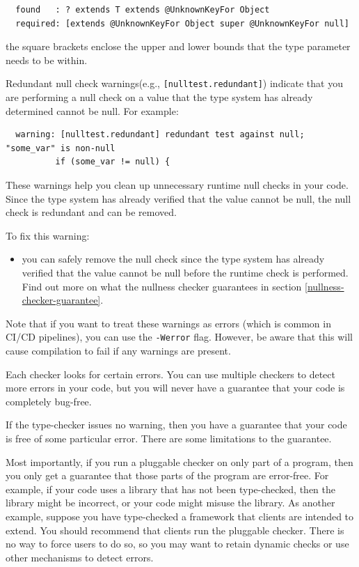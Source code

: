 \begin{Verbatim}
  found   : ? extends T extends @UnknownKeyFor Object
  required: [extends @UnknownKeyFor Object super @UnknownKeyFor null]
\end{Verbatim}

\noindent
the square brackets enclose the upper and lower bounds that the type parameter needs to be within.


Redundant null check warnings(e.g., \texttt{[nulltest.redundant]}) indicate that you are performing a null check on a value that the type system has already determined cannot be null. For example:
\begin{Verbatim}
  warning: [nulltest.redundant] redundant test against null; "some_var" is non-null
          if (some_var != null) {
\end{Verbatim}
These warnings help you clean up unnecessary runtime null checks in your code. Since the type system has already verified that the value cannot be null, the null check is redundant and can be removed.

To fix this warning:
\begin{itemize}
\item
  you can safely remove the null check since the type system has already verified that the value cannot be null before the runtime check is performed. Find out more on what the nullness checker guarantees in section \ref{nullness-checker-guarantee}.
\end{itemize}

Note that if you want to treat these warnings as errors (which is common in CI/CD pipelines), you can use the \texttt{-Werror} flag. However, be aware that this will cause compilation to fail if any warnings are present.



Each checker looks for certain errors.  You can use multiple checkers to
detect more errors in your code, but you will never have a guarantee that
your code is completely bug-free.

If the type-checker issues no warning, then you have a guarantee that your
code is free of some particular error.  There are some limitations to the
guarantee.

Most importantly, if you run a pluggable checker on only part of a program, then
you only get a guarantee that those parts of the program are error-free.
For example, if your code uses a library that has not been type-checked,
then the library might be incorrect, or your code might misuse the library.
As another example, suppose you have type-checked a framework that clients
are intended to extend.  You should recommend that clients
run the pluggable checker.  There is no way to force users to do so, so you
may want to retain dynamic checks or use other mechanisms to detect errors.

